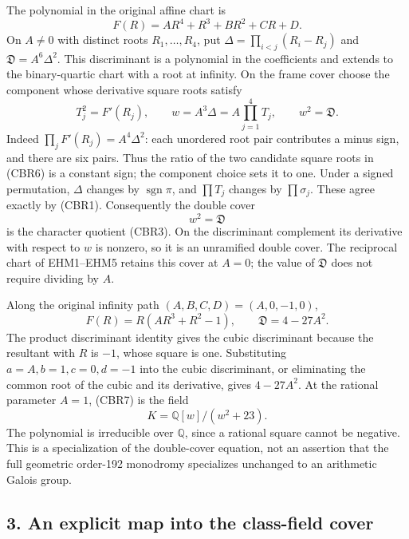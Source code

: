 \documentclass[
  10pt,
  a4paper,
]{article}
\begin{document}
The polynomial in the original affine chart is \[
F(R)=AR^4+R^3+BR^2+CR+D.
\tag{CBR5}
\] On \(A\ne0\) with distinct roots \(R_1,\ldots,R_4\), put
\(\Delta=\prod_{i<j}(R_i-R_j)\) and \(\mathfrak D=A^6\Delta^2\). This
discriminant is a polynomial in the coefficients and extends to the
binary-quartic chart with a root at infinity. On the frame cover choose
the component whose derivative square roots satisfy \[
T_j^2=F'(R_j),\qquad
w=A^3\Delta=A\prod_{j=1}^4T_j,\qquad w^2=\mathfrak D.
\tag{CBR6}
\] Indeed \(\prod_jF'(R_j)=A^4\Delta^2\): each unordered root pair
contributes a minus sign, and there are six pairs. Thus the ratio of the
two candidate square roots in (CBR6) is a constant sign; the component
choice sets it to one. Under a signed permutation, \(\Delta\) changes by
\(\operatorname{sgn}\pi\), and \(\prod T_j\) changes by
\(\prod\sigma_j\). These agree exactly by (CBR1). Consequently the
double cover \[
w^2=\mathfrak D
\tag{CBR7}
\] is the character quotient (CBR3). On the discriminant complement its
derivative with respect to \(w\) is nonzero, so it is an unramified
double cover. The reciprocal chart of EHM1--EHM5 retains this cover at
\(A=0\); the value of \(\mathfrak D\) does not require dividing by
\(A\).

Along the original infinity path \((A,B,C,D)=(A,0,-1,0)\), \[
F(R)=R(AR^3+R^2-1),\qquad
\mathfrak D=4-27A^2.
\tag{CBR8}
\] The product discriminant identity gives the cubic discriminant
because the resultant with \(R\) is \(-1\), whose square is one.
Substituting \(a=A,b=1,c=0,d=-1\) into the cubic discriminant, or
eliminating the common root of the cubic and its derivative, gives
\(4-27A^2\). At the rational parameter \(A=1\), (CBR7) is the field \[
K=\mathbb Q[w]/(w^2+23).
\tag{CBR9}
\] The polynomial is irreducible over \(\mathbb Q\), since a rational
square cannot be negative. This is a specialization of the double-cover
equation, not an assertion that the full geometric order-192 monodromy
specializes unchanged to an arithmetic Galois group.

\subsection{3. An explicit map into the class-field
cover}\label{an-explicit-map-into-the-class-field-cover}
\end{document}
